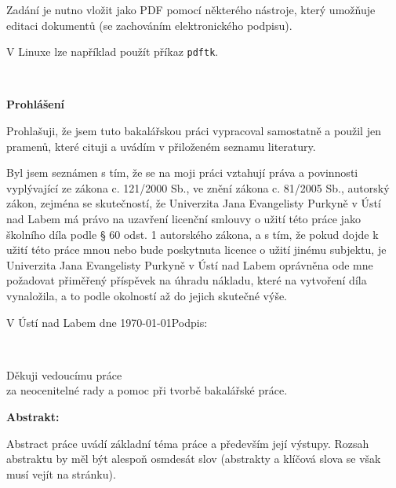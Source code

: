 \documentclass[male,czech]{kitheses}
\newcommand{\ZT}[1]{\colorbox{yellow}{\color{red}{#1}}}
\newcommand{\nazevcz}{\ZT{Závěrečná práce na KI PřF UJEP}}        %
\newcommand{\vedouciDAT}{\ZT{RNDr. Jiřímu Škvorovi, Ph.D.}}
\begin{document}
Zadání je nutno vložit jako PDF pomocí některého nástroje, který umožňuje editaci dokumentů (se zachováním
elektronického podpisu).

V Linuxe lze například použít příkaz \texttt{pdftk}.

\clearpage
\thispagestyle{empty}
\afterpage{\nopagecolor}
~
\clearpage

\thispagestyle{empty} 
{\bfseries Prohlášení}

\vspace{0.5cm}
Prohlašuji, že jsem tuto bakalářskou práci vypracoval
samostatně a použil
jen pramenů, které cituji a uvádím v přiloženém seznamu literatury.

\vspace{0.5em}

Byl jsem seznámen 
s tím, že se na moji práci vztahují práva a povinnosti vyplývající ze
zákona c. 121/2000 Sb., ve znění zákona c. 81/2005 Sb., autorský zákon, zejména se
skutečností, že Univerzita Jana Evangelisty Purkyně v Ústí nad Labem má právo na uzavření
licenční smlouvy o užití této práce jako školního díla podle § 60 odst. 1 autorského zákona, a
s tím, že pokud dojde k užití této práce mnou nebo bude poskytnuta licence o užití jinému
subjektu, je Univerzita Jana Evangelisty Purkyně v Ústí nad Labem oprávněna ode mne
požadovat přiměřený příspěvek na úhradu nákladu, které na vytvoření díla vynaložila, a to
podle okolností až do jejich skutečné výše.

\vspace{2em}

V Ústí nad Labem dne \today   \hfill Podpis: \makebox[4cm][s]{\dotfill}

\cleardoublepage
\thispagestyle{empty}
~
\vfill

\begin{flushright}
    Děkuji vedoucímu práce \ZT{\vedouciDAT}\\ 
    za neocenitelné rady a pomoc při tvorbě bakalářské práce.
\end{flushright}

\cleardoublepage

\textsc{\nazevcz}

\textbf{Abstrakt:}

Abstract práce uvádí základní téma práce a především její výstupy. Rozsah abstraktu by měl být alespoň osmdesát slov (abstrakty a klíčová slova se však musí vejít na stránku).
\end{document}
